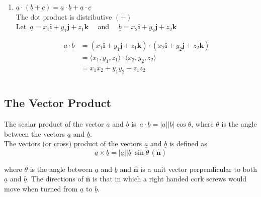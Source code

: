 \documentclass[11pt,a4paper]{article}
\theoremstyle{definition}
\begin{document}
\begin{enumerate}
\item $\underline{a}\cdot \left(\underline{b} + \underline{c}\right) = \underline{a}\cdot \underline{b} + \underline{a}\cdot \underline{c}$\\

The dot product is distributive $(+)$\\

Let $\, \underline{a} = x_1\textbf{i} + y_1\textbf{j} + z_1\textbf{k}\quad $ and $\quad  \underline{b} = x_2\textbf{i} + y_2\textbf{j} + z_2\textbf{k}$


\begin{align*}
\underline{a}\cdot \underline{b} & = \left( x_1\textbf{i} + y_1\textbf{j} + z_1\textbf{k}\right)\cdot \left(x_2\textbf{i} + y_2\textbf{j} + z_2\textbf{k}\right)\\
& = \big\langle x_1, y_1, z_1\big\rangle \cdot \big\langle x_2, y_2, z_2\big\rangle\\
& = x_1x_2 + y_1y_2 + z_1z_2\\\\ 
\end{align*}
\end{enumerate}









\subsection{The Vector Product}

The scalar product of the vector $\underline{a}$ and $\underline{b}$ is $\, \underline{a}\cdot \underline{b} = \left|\underline{a}\right| \left|\underline{b}\right|\cos \theta$, where $\theta$ is the angle between the vectors $\underline{a}$ and $\underline{b}$.\\

The vectors (or cross) product of the vectors $\underline{a}$ and $\underline{b}$ is defined as  
$$\underline{a}\times \underline{b} = \left|\underline{a}\right| \left|\underline{b}\right|\sin \theta\,(\hat{\textbf{n}})$$

where $\theta$ is the angle between $\underline{a}$ and $\underline{b}$ and $\hat{\textbf{n}}$ is a unit vector perpendicular to both $\underline{a}$ and $\underline{b}$. The directions of $\hat{\textbf{n}}$ is that in which a right handed cork screws would move when turned from $\underline{a}$ to $\underline{b}$.


\end{document}
